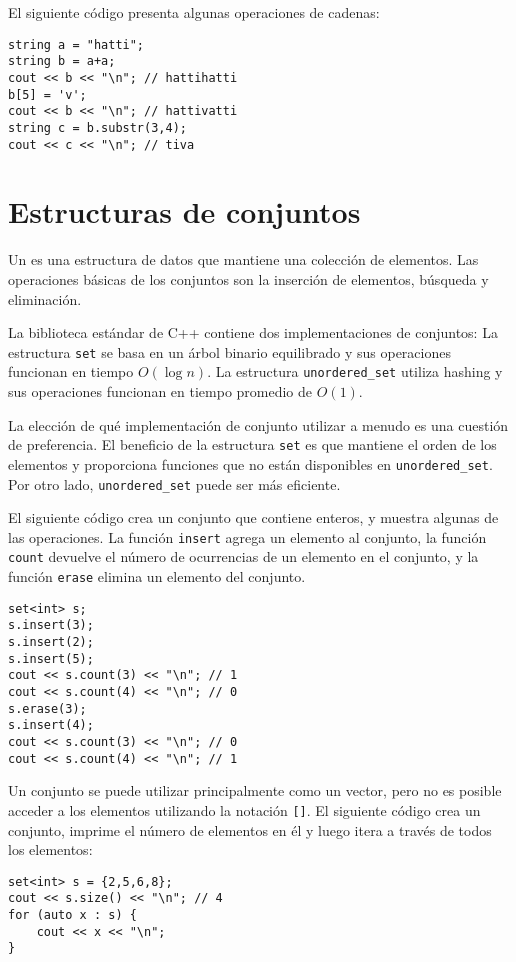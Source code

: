 El siguiente código presenta algunas operaciones de cadenas:

\begin{lstlisting}
string a = "hatti";
string b = a+a;
cout << b << "\n"; // hattihatti
b[5] = 'v';
cout << b << "\n"; // hattivatti
string c = b.substr(3,4);
cout << c << "\n"; // tiva
\end{lstlisting}

\section{Estructuras de conjuntos}


Un  es una estructura de datos que
mantiene una colección de elementos.
Las operaciones básicas de los conjuntos son la inserción
de elementos, búsqueda y eliminación.

La biblioteca estándar de C++ contiene dos implementaciones
de conjuntos:
La estructura \texttt{set} se basa en un árbol binario equilibrado
y sus operaciones funcionan en tiempo $O(\log n)$.
La estructura \texttt{unordered\_set} utiliza hashing
y sus operaciones funcionan en tiempo promedio de $O(1)$.

La elección de qué implementación de conjunto utilizar
a menudo es una cuestión de preferencia.
El beneficio de la estructura \texttt{set} es que mantiene
el orden de los elementos y proporciona funciones que
no están disponibles en \texttt{unordered\_set}.
Por otro lado, \texttt{unordered\_set}
puede ser más eficiente.

El siguiente código crea un conjunto
que contiene enteros,
y muestra algunas de las operaciones.
La función \texttt{insert} agrega un elemento al conjunto,
la función \texttt{count} devuelve el número de ocurrencias
de un elemento en el conjunto,
y la función \texttt{erase} elimina un elemento del conjunto.

\begin{lstlisting}
set<int> s;
s.insert(3);
s.insert(2);
s.insert(5);
cout << s.count(3) << "\n"; // 1
cout << s.count(4) << "\n"; // 0
s.erase(3);
s.insert(4);
cout << s.count(3) << "\n"; // 0
cout << s.count(4) << "\n"; // 1
\end{lstlisting}

Un conjunto se puede utilizar principalmente como un vector,
pero no es posible acceder
a los elementos utilizando la notación \texttt{[]}.
El siguiente código crea un conjunto,
imprime el número de elementos en él y luego
itera a través de todos los elementos:
\begin{lstlisting}
set<int> s = {2,5,6,8};
cout << s.size() << "\n"; // 4
for (auto x : s) {
    cout << x << "\n";
}
\end{lstlisting}

